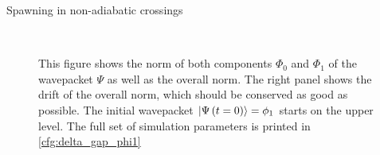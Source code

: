 \begin{chapter}{Spawning in non-adiabatic crossings}
\begin{figure}[h!]
  \centering
   \\
  \caption[Norms and norm drift for a $\phi_1$ in an avoided crossing]{
  This figure shows the norm of both components $\Phi_0$ and $\Phi_1$ of the
  wavepacket $\Psi$ as well as the overall norm. The right panel shows the drift
  of the overall norm, which should be conserved as good as possible.
  The initial wavepacket $\Ket{\Psi\left( t=0 \right)} = \phi_1$ starts on the upper level.
  The full set of simulation parameters is printed in \ref{cfg:delta_gap_phi1}
  \label{fig:basic_delta_gap_phi1_norms}
  }
\end{figure}



\end{chapter}
